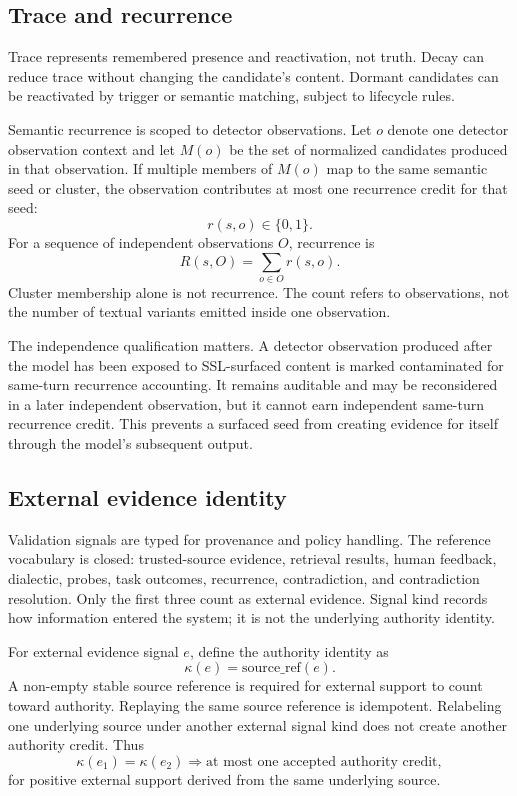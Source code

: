 \documentclass[11pt]{article}
\begin{document}
\subsection{Trace and recurrence}

Trace represents remembered presence and reactivation, not truth. Decay can reduce trace without changing the candidate's content. Dormant candidates can be reactivated by trigger or semantic matching, subject to lifecycle rules.

Semantic recurrence is scoped to detector observations. Let $o$ denote one detector observation context and let $M(o)$ be the set of normalized candidates produced in that observation. If multiple members of $M(o)$ map to the same semantic seed or cluster, the observation contributes at most one recurrence credit for that seed:
\begin{equation}
  r(s,o) \in \{0,1\}.
\end{equation}
For a sequence of independent observations $O$, recurrence is
\begin{equation}
  R(s,O)=\sum_{o\in O} r(s,o).
\end{equation}
Cluster membership alone is not recurrence. The count refers to observations, not the number of textual variants emitted inside one observation.

The independence qualification matters. A detector observation produced after the model has been exposed to SSL-surfaced content is marked contaminated for same-turn recurrence accounting. It remains auditable and may be reconsidered in a later independent observation, but it cannot earn independent same-turn recurrence credit. This prevents a surfaced seed from creating evidence for itself through the model's subsequent output.

\subsection{External evidence identity}

Validation signals are typed for provenance and policy handling. The reference vocabulary is closed: trusted-source evidence, retrieval results, human feedback, dialectic, probes, task outcomes, recurrence, contradiction, and contradiction resolution. Only the first three count as external evidence. Signal kind records how information entered the system; it is not the underlying authority identity.

For external evidence signal $e$, define the authority identity as
\begin{equation}
  \kappa(e)=\mathrm{source\_ref}(e).
\end{equation}
A non-empty stable source reference is required for external support to count toward authority. Replaying the same source reference is idempotent. Relabeling one underlying source under another external signal kind does not create another authority credit. Thus
\begin{equation}
  \kappa(e_1)=\kappa(e_2) \Rightarrow \text{at most one accepted authority credit},
\end{equation}
for positive external support derived from the same underlying source.
\end{document}
